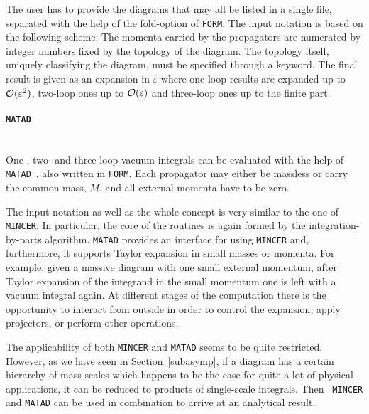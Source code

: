 The user has to provide the diagrams that may all be listed in a single
file, separated with the help of the fold-option of {\tt FORM}.  The
input notation is based on the following scheme: The momenta carried by
the propagators are numerated by integer numbers fixed by the topology
of the diagram. The topology itself, uniquely classifying the diagram,
must be specified through a keyword.  The final result is given as an
expansion in $\varepsilon$ where one-loop results are expanded up to
${\cal O}(\varepsilon^2)$, two-loop ones up to ${\cal O}(\varepsilon)$
and three-loop ones up to the finite part.


\paragraph{{\tt MATAD}}\mbox{}\\[1em]
%
One-, two- and three-loop vacuum integrals can be evaluated with the
help of {\tt MATAD}~\cite{Stediss}, also written in {\tt FORM}. Each
propagator may either be massless or carry the common mass, $M$, and all
external momenta have to be zero.

The input notation as well as the whole concept is very similar to the
one of {\tt MINCER}. In particular, the core of the routines is again
formed by the integration-by-parts algorithm.  {\tt MATAD} provides an
interface for using {\tt MINCER} and, furthermore, it supports Taylor
expansion in small masses or momenta. For example, given a massive
diagram with one small external momentum, after Taylor expansion of the
integrand in the small momentum one is left with a vacuum integral
again.  At different stages of the computation there is the opportunity
to interact from outside in order to control the expansion, apply
projectors, or perform other operations.

The applicability of both {\tt MINCER} and {\tt MATAD} seems to be quite
restricted.  However, as we have seen in
Section~\ref{subasymp}, if a diagram has a certain hierarchy of mass scales
which happens to be the case for quite a lot of physical applications,
it can be reduced to products of single-scale integrals. Then {\tt
  MINCER} and {\tt MATAD} can be used in combination to arrive at an
analytical result.


